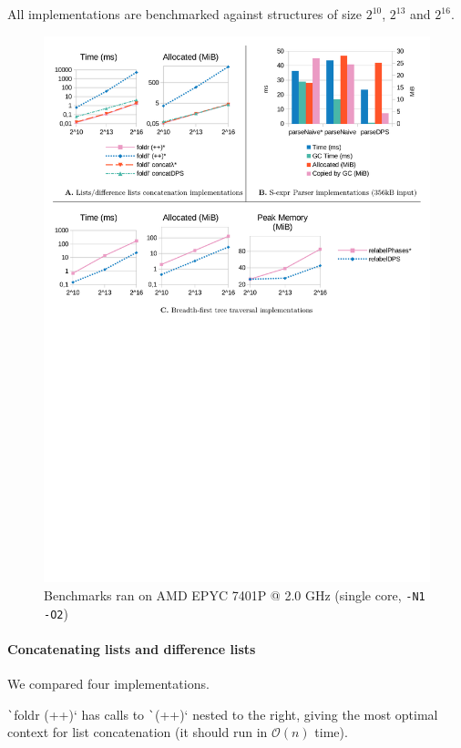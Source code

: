 \documentclass[english]{jflart}
\begin{document}
All implementations are benchmarked against structures of size $2^{10}$, $2^{13}$ and $2^{16}$.

\begin{figure}[t]\centering
  \includegraphics[width=13.8cm]{bench-charts.pdf}
  \caption{Benchmarks ran on AMD EPYC 7401P @ 2.0 GHz (single core, \texttt{-N1 -O2})}
  \label{fig:bench-charts}
\end{figure}

\paragraph{Concatenating lists and difference lists}

We compared four implementations.

\texttt`foldr (++)` has calls to \texttt`(++)` nested to the right, giving the most optimal context for list concatenation (it should run in $\mathcal{O}(n)$ time).
\end{document}
